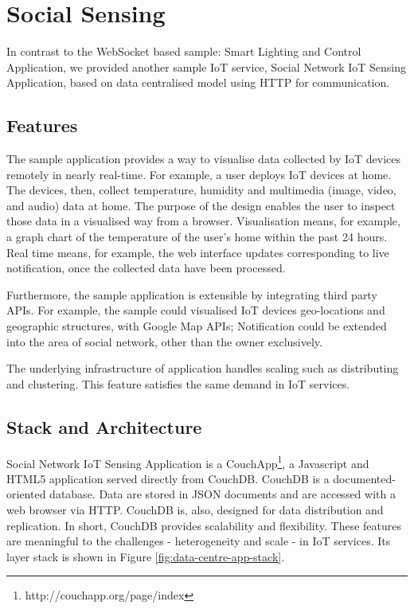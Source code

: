 \section{Social Sensing}
In contrast to the WebSocket based sample: Smart Lighting and Control Application, we provided another sample IoT service, Social Network IoT Sensing Application, based on data centralised model using HTTP for communication. 

\subsection{Features}
The sample application provides a way to visualise data collected by IoT devices remotely in nearly real-time. For example, a user deploys IoT devices at home. The devices, then, collect temperature, humidity and multimedia (image, video, and audio) data at home. The purpose of the design enables the user to inspect those data in a visualised way from a browser. Visualisation means, for example, a graph chart of the temperature of the user's home within the past 24 hours. Real time means, for example, the web interface updates corresponding to live notification, once the collected data have been processed.

Furthermore, the sample application is extensible by integrating third party APIs. For example, the sample could visualised IoT devices geo-locations and geographic structures, with Google Map APIs; Notification could be extended into the area of social network, other than the owner exclusively. 

The underlying infrastructure of application handles scaling such as distributing and clustering. This feature satisfies the same demand in IoT services.

\subsection{Stack and Architecture}
Social Network IoT Sensing Application is a CouchApp\footnote{http://couchapp.org/page/index}, a Javascript and HTML5 application served directly from CouchDB. CouchDB is a documented-oriented database. Data are stored in JSON documents and are accessed with a web browser via HTTP. CouchDB is, also, designed for data distribution and replication. In short, CouchDB provides scalability and flexibility. These features are meaningful to the challenges\cite{francesco2012storage} - heterogeneity and scale - in IoT services. Its layer stack is shown in Figure \ref{fig:data-centre-app-stack}.

